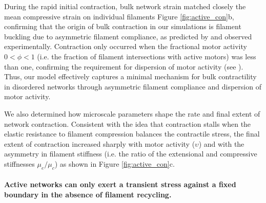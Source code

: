 \documentclass[10pt,letterpaper]{article}
\begin{document}
During the rapid initial contraction, bulk network strain matched closely the mean compressive strain on individual filaments Figure \ref{fig:active_con}b, confirming that the origin of bulk contraction in our simulations is filament buckling due to asymmetric filament compliance, as predicted by \cite{1367-2630-14-3-033037,PhysRevX.4.041002} and observed experimentally\cite{rheo_2D1}. Contraction only occurred when the fractional motor activity $0<\phi<1$ (i.e. the fraction of filament intersections with active motors) was less than one, confirming the requirement for dispersion of motor activity (see ). Thus, our model effectively captures a minimal mechanism for bulk contractility in disordered networks through asymmetric filament compliance and dispersion of motor activity.

We also determined how microscale parameters shape the rate and final extent of network contraction. Consistent with the idea that contraction stalls when the elastic resistance to filament compression balances the contractile stress, the final extent of contraction increased sharply with motor activity ($\upsilon$) and with the asymmetry in filament stiffness (i.e. the ratio of the extensional and compressive stiffnesses $\mu_e/\mu_c$) as shown in Figure \ref{fig:active_con}c.


\paragraph{Active networks can only exert a transient stress against a fixed boundary in the absence of filament recycling.}
\end{document}
